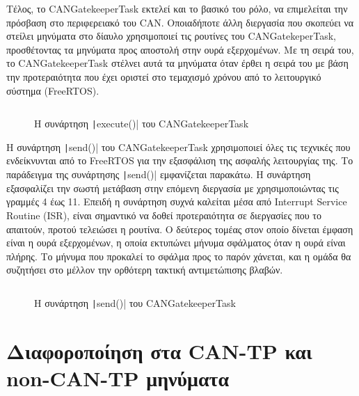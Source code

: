\documentclass[a4paper,nobib,justified]{tufte-book}
\begin{document}
 Τέλος, το CANGatekeeperTask εκτελεί και το βασικό του ρόλο, να επιμελείται την πρόσβαση στο περιφερειακό του CAN. Οποιαδήποτε άλλη διεργασία που σκοπεύει να στείλει μηνύματα στο δίαυλο χρησιμοποιεί τις ρουτίνες του CANGatekeperTask, προσθέτοντας τα μηνύματα προς αποστολή στην ουρά εξερχομένων. Με τη σειρά του, το CANGatekeeperTask στέλνει αυτά τα μηνύματα όταν έρθει η σειρά του με βάση την προτεραιότητα που έχει οριστεί στο τεμαχισμό χρόνου από το λειτουργικό σύστημα (FreeRTOS).

\begin{figure}
	\inputminted{c++}{code/examples/gatekeeper-execute.cpp}
	\label{code:gatekeeper-execute}
	\caption[Η συνάρτηση \texttt|execute()| του CANGatekeeperTask]{Η συνάρτηση \texttt|execute()| του CANGatekeeperTask}
\end{figure}

Η συνάρτηση \texttt|send()| του CANGatekeeperTask χρησιμοποιεί όλες τις τεχνικές που ενδείκνυνται από το FreeRTOS για την εξασφάλιση της ασφαλής λειτουργίας της. Το παράδειγμα της συνάρτησης \texttt|send()| εμφανίζεται παρακάτω. Η συνάρτηση εξασφαλίζει την σωστή μετάβαση στην επόμενη διεργασία με χρησιμοποιώντας τις γραμμές 4 έως 11. Επειδή η συνάρτηση συχνά καλείται μέσα από Interrupt Service Routine (ISR), είναι σημαντικό να δοθεί προτεραιότητα σε διεργασίες που το απαιτούν, προτού τελειώσει η ρουτίνα. Ο δεύτερος τομέας στον οποίο δίνεται έμφαση είναι η ουρά εξερχομένων, η οποία εκτυπώνει μήνυμα σφάλματος όταν η ουρά είναι πλήρης. Το μήνυμα που προκαλεί το σφάλμα προς το παρόν χάνεται, και η ομάδα θα συζητήσει στο μέλλον την ορθότερη τακτική αντιμετώπισης βλαβών.

\begin{figure}
	\inputminted{c++}{code/examples/gatekeeper-send.cpp}
	\label{code:gatekeeper-send}
	\caption[Η συνάρτηση \texttt|send()| του CANGatekeeperTask]{Η συνάρτηση \texttt|send()| του CANGatekeeperTask}
\end{figure}
\FloatBarrier

\section{Διαφοροποίηση στα CAN-TP και non-CAN-TP μηνύματα}
\end{document}
